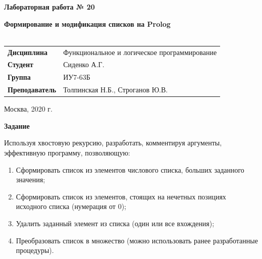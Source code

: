 \documentclass[a4paper,14pt]{extreport} %
\begin{document}
\begin{titlepage}
    \vspace{4cm}

    \begin{center}
        \textbf{Лабораторная работа № 20} \\ 
        \hfill
        
        \textbf{Формирование и модификация списков на Prolog} \\
        \vspace{0.5cm}
        \textbf{} \\
    \end{center}

    \vspace{4cm}

    \begin{flushleft}
        \begin{tabular}{ll}
            \textbf{Дисциплина} & Функциональное и логическое программирование \\
            \textbf{Студент} & Сиденко А.Г. \\
            \textbf{Группа} & ИУ7-63Б \\
            \textbf{Преподаватель} & Толпинская Н.Б., Строганов Ю.В.  \\
        \end{tabular}
    \end{flushleft}

    \vspace{4cm}

   \begin{center}
        Москва, 2020 г.
    \end{center}

\end{titlepage}

\textbf{Задание}

Используя хвостовую рекурсию, разработать, комментируя аргументы, эффективную программу, позволяющую:

\begin{enumerate}
\item Сформировать список из элементов числового списка, больших заданного значения;
\item Сформировать список из элементов, стоящих на нечетных позициях исходного списка (нумерация от 0);
\item Удалить заданный элемент из списка (один или все вхождения);
\item Преобразовать список в множество (можно использовать ранее разработанные процедуры).
\end{enumerate}
\end{document}
